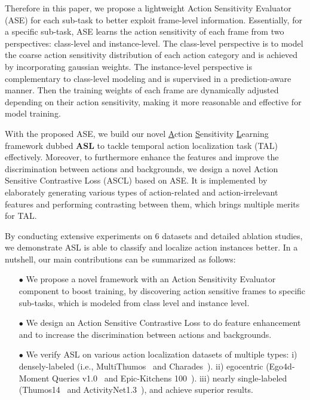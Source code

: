 \documentclass[10pt,twocolumn,letterpaper]{article}
\begin{document}
\par Therefore in this paper, we propose a lightweight Action Sensitivity Evaluator (ASE) for each sub-task to better exploit frame-level information. Essentially, for a specific sub-task, ASE learns the action sensitivity of each frame from two perspectives: class-level and instance-level. The class-level perspective is to model the coarse action sensitivity distribution of each action category and is achieved by incorporating gaussian weights. The instance-level perspective is complementary to class-level modeling and is supervised in a prediction-aware manner. Then the training weights of each frame are dynamically adjusted depending on their action sensitivity, making it more reasonable and effective for model training.
\par With the proposed ASE, we build our novel \underline{A}ction \underline{S}ensitivity \underline{L}earning framework dubbed \textbf{ASL} to tackle temporal action localization task (TAL) effectively.  Moreover, to furthermore enhance the features and improve the discrimination between actions and backgrounds, we design a novel Action Sensitive Contrastive Loss (ASCL) based on ASE. It is implemented by elaborately generating various types of action-related and action-irrelevant features and performing contrasting between them, which brings multiple merits for TAL.
\par By conducting extensive experiments on 6 datasets and detailed ablation studies, we demonstrate ASL is able to classify and localize action instances better. In a nutshell, our main contributions can be summarized as follows:
\begin{itemize}
\item[$\bullet$] We propose a novel framework with an Action Sensitivity Evaluator component to boost training,  by discovering action sensitive frames to specific sub-tasks, which is modeled from class level and instance level.
\vspace{-0.2em}
\item[$\bullet$] We design an Action Sensitive Contrastive Loss to do feature enhancement and to increase the discrimination between actions and backgrounds.
\vspace{-0.2em}
\item[$\bullet$] We verify ASL on various action localization datasets of multiple types: i) densely-labeled (i.e., MultiThumos~\cite{multithumos} and Charades~\cite{charades}). ii) egocentric (Ego4d-Moment Queries v1.0~\cite{grauman2022ego4d} and Epic-Kitchens 100~\cite{Damen2018EPICKITCHENS}). iii) nearly single-labeled (Thumos14~\cite{thumos} and ActivityNet1.3~\cite{caba2015activitynet}), and achieve superior results.
\end{itemize}
\end{document}
